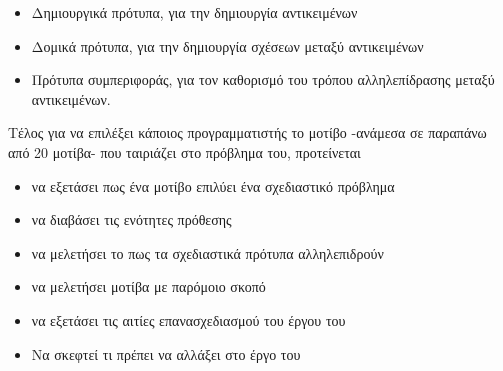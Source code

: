 \begin{itemize}
    \item Δημιουργικά πρότυπα, για την δημιουργία αντικειμένων
    \item Δομικά πρότυπα, για την δημιουργία σχέσεων μεταξύ αντικειμένων
    \item Πρότυπα συμπεριφοράς, για τον καθορισμό του τρόπου αλληλεπίδρασης μεταξύ αντικειμένων.
\end{itemize}
Τέλος για να επιλέξει κάποιος προγραμματιστής το μοτίβο -ανάμεσα σε παραπάνω από 20 μοτίβα- που ταιριάζει στο πρόβλημα του, προτείνεται 
\begin{itemize}
    \item να εξετάσει πως ένα μοτίβο επιλύει ένα σχεδιαστικό πρόβλημα
    \item να διαβάσει τις ενότητες πρόθεσης
    \item να μελετήσει το πως τα σχεδιαστικά πρότυπα αλληλεπιδρούν
    \item να μελετήσει μοτίβα με παρόμοιο σκοπό
    \item να εξετάσει τις αιτίες επανασχεδιασμού του έργου του
    \item Να σκεφτεί τι πρέπει να αλλάξει στο έργο του
\end{itemize}
